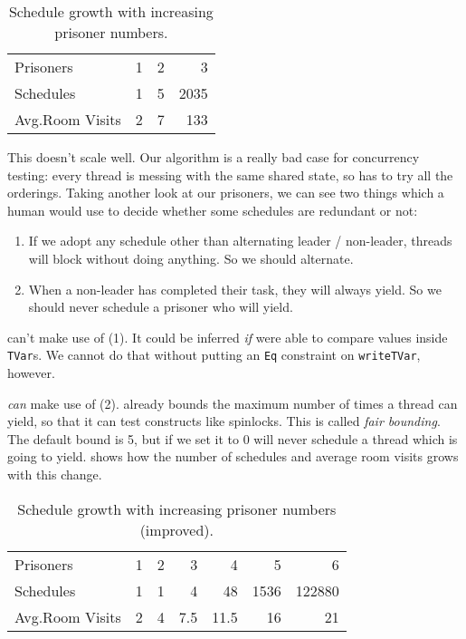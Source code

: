 \begin{table}
  \centering
  \begin{tabular}{l|rrr} \toprule
    Prisoners          & 1 & 2 &    3 \\
    Schedules          & 1 & 5 & 2035 \\
    Avg.\@ Room Visits & 2 & 7 &  133 \\ \bottomrule
  \end{tabular}
  \caption{Schedule growth with increasing prisoner numbers.}\label{tbl:100slow}
\end{table}

This doesn't scale well.  Our algorithm is a really bad case for
concurrency testing: every thread is messing with the same shared
state, so \dejafu{} has to try all the orderings.  Taking another look
at our prisoners, we can see two things which a human would use to
decide whether some schedules are redundant or not:

\begin{enumerate}
\item If we adopt any schedule other than alternating leader /
  non-leader, threads will block without doing anything.  So we should
  alternate.
\item When a non-leader has completed their task, they will always
  yield.  So we should never schedule a prisoner who will yield.
\end{enumerate}

\dejafu{} can't make use of (1).  It could be inferred \emph{if}
\dejafu{} were able to compare values inside \verb|TVar|s.  We cannot
do that without putting an \verb|Eq| constraint on \verb|writeTVar|,
however.

\dejafu{} \emph{can} make use of (2).  \dejafu{} already bounds the
maximum number of times a thread can yield, so that it can test
constructs like spinlocks.  This is called \emph{fair bounding}.  The
default bound is 5, but if we set it to 0 \dejafu{} will never
schedule a thread which is going to yield.   shows how
the number of schedules and average room visits grows with this
change.

\begin{table}
  \centering
  \begin{tabular}{l|rrrrrr} \toprule
    Prisoners          & 1 & 2 & 3   &  4   &    5 &      6 \\
    Schedules          & 1 & 1 & 4   & 48   & 1536 & 122880 \\
    Avg.\@ Room Visits & 2 & 4 & 7.5 & 11.5 &   16 &     21 \\ \bottomrule
  \end{tabular}
  \caption{Schedule growth with increasing prisoner numbers (improved).}\label{tbl:100fast}
\end{table}

